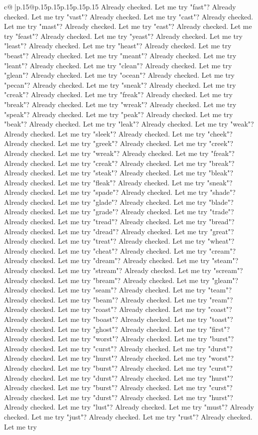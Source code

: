 \documentclass{article}
\begin{document}
{\begin{supertabular}{c@{$\;$}|p{.15\linewidth}@{}p{.15\linewidth}p{.15\linewidth}p{.15\linewidth}p{.15\linewidth}p{.15\linewidth}}
{{{Already checked. Let me try "fast"? Already checked. Let me try "vast"? Already checked. Let me try "cast"? Already checked. Let me try "mast"? Already checked. Let me try "east"? Already checked. Let me try "feast"? Already checked. Let me try "yeast"? Already checked. Let me try "least"? Already checked. Let me try "heast"? Already checked. Let me try "beast"? Already checked. Let me try "meant"? Already checked. Let me try "leant"? Already checked. Let me try "clean"? Already checked. Let me try "glean"? Already checked. Let me try "ocean"? Already checked. Let me try "pecan"? Already checked. Let me try "sneak"? Already checked. Let me try "creak"? Already checked. Let me try "freak"? Already checked. Let me try "break"? Already checked. Let me try "wreak"? Already checked. Let me try "speak"? Already checked. Let me try "peak"? Already checked. Let me try "beak"? Already checked. Let me try "leak"? Already checked. Let me try "weak"? Already checked. Let me try "sleek"? Already checked. Let me try "cheek"? Already checked. Let me try "greek"? Already checked. Let me try "creek"? Already checked. Let me try "wreak"? Already checked. Let me try "freak"? Already checked. Let me try "creak"? Already checked. Let me try "break"? Already checked. Let me try "steak"? Already checked. Let me try "bleak"? Already checked. Let me try "fleak"? Already checked. Let me try "sneak"? Already checked. Let me try "spade"? Already checked. Let me try "shade"? Already checked. Let me try "glade"? Already checked. Let me try "blade"? Already checked. Let me try "grade"? Already checked. Let me try "trade"? Already checked. Let me try "tread"? Already checked. Let me try "bread"? Already checked. Let me try "dread"? Already checked. Let me try "great"? Already checked. Let me try "treat"? Already checked. Let me try "wheat"? Already checked. Let me try "cheat"? Already checked. Let me try "cream"? Already checked. Let me try "dream"? Already checked. Let me try "steam"? Already checked. Let me try "stream"? Already checked. Let me try "scream"? Already checked. Let me try "bream"? Already checked. Let me try "gleam"? Already checked. Let me try "seam"? Already checked. Let me try "team"? Already checked. Let me try "beam"? Already checked. Let me try "ream"? Already checked. Let me try "roast"? Already checked. Let me try "coast"? Already checked. Let me try "boast"? Already checked. Let me try "toast"? Already checked. Let me try "ghost"? Already checked. Let me try "first"? Already checked. Let me try "worst"? Already checked. Let me try "burst"? Already checked. Let me try "curst"? Already checked. Let me try "durst"? Already checked. Let me try "hurst"? Already checked. Let me try "worst"? Already checked. Let me try "burst"? Already checked. Let me try "curst"? Already checked. Let me try "durst"? Already checked. Let me try "hurst"? Already checked. Let me try "burst"? Already checked. Let me try "curst"? Already checked. Let me try "durst"? Already checked. Let me try "hurst"? Already checked. Let me try "lust"? Already checked. Let me try "must"? Already checked. Let me try "just"? Already checked. Let me try "rust"? Already checked. Let me try }}}
\end{supertabular}}
\end{document}

